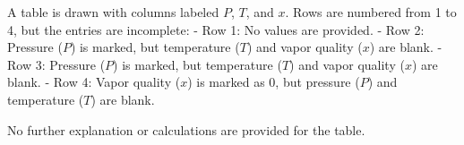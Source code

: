 A table is drawn with columns labeled \( P \), \( T \), and \( x \). Rows are numbered from 1 to 4, but the entries are incomplete:  
- Row 1: No values are provided.  
- Row 2: Pressure (\( P \)) is marked, but temperature (\( T \)) and vapor quality (\( x \)) are blank.  
- Row 3: Pressure (\( P \)) is marked, but temperature (\( T \)) and vapor quality (\( x \)) are blank.  
- Row 4: Vapor quality (\( x \)) is marked as \( 0 \), but pressure (\( P \)) and temperature (\( T \)) are blank.  

No further explanation or calculations are provided for the table.